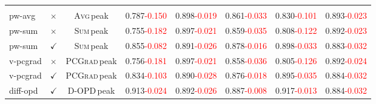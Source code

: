 \documentclass[11pt]{article}
\begin{document}
\begin{table}[ht]
{\begin{tabular}{@{}llc|cc|c|cc@{}}
\addlinespace
\multicolumn{8}{@{}l}{\textit{OPD training (running, peak eval)}} \\
pw-avg & $\times$ & \textsc{Avg}{\footnotesize\,peak} & \cellcolor{gray!20}0.787{\footnotesize\textcolor{red}{-0.150}} & 0.898{\footnotesize\textcolor{red}{-0.019}} & \cellcolor{gray!20}0.861{\footnotesize\textcolor{red}{-0.033}} & \cellcolor{gray!20}0.830{\footnotesize\textcolor{red}{-0.101}} & 0.893{\footnotesize\textcolor{red}{-0.023}} \\
pw-sum & $\times$ & \textsc{Sum}{\footnotesize\,peak} & \cellcolor{gray!20}0.755{\footnotesize\textcolor{red}{-0.182}} & 0.897{\footnotesize\textcolor{red}{-0.021}} & \cellcolor{gray!20}0.859{\footnotesize\textcolor{red}{-0.035}} & \cellcolor{gray!20}0.808{\footnotesize\textcolor{red}{-0.122}} & 0.892{\footnotesize\textcolor{red}{-0.023}} \\
pw-sum & $\checkmark$ & \textsc{Sum}{\footnotesize\,peak} & \cellcolor{gray!20}0.855{\footnotesize\textcolor{red}{-0.082}} & 0.891{\footnotesize\textcolor{red}{-0.026}} & \cellcolor{gray!20}0.878{\footnotesize\textcolor{red}{-0.016}} & \cellcolor{gray!20}0.898{\footnotesize\textcolor{red}{-0.033}} & 0.883{\footnotesize\textcolor{red}{-0.032}} \\
v-pcgrad & $\times$ & \textsc{PCGrad}{\footnotesize\,peak} & \cellcolor{gray!20}0.756{\footnotesize\textcolor{red}{-0.181}} & 0.897{\footnotesize\textcolor{red}{-0.021}} & \cellcolor{gray!20}0.858{\footnotesize\textcolor{red}{-0.036}} & \cellcolor{gray!20}0.805{\footnotesize\textcolor{red}{-0.126}} & 0.892{\footnotesize\textcolor{red}{-0.024}} \\
v-pcgrad & $\checkmark$ & \textsc{PCGrad}{\footnotesize\,peak} & \cellcolor{gray!20}0.834{\footnotesize\textcolor{red}{-0.103}} & 0.890{\footnotesize\textcolor{red}{-0.028}} & \cellcolor{gray!20}0.876{\footnotesize\textcolor{red}{-0.018}} & \cellcolor{gray!20}0.895{\footnotesize\textcolor{red}{-0.035}} & 0.884{\footnotesize\textcolor{red}{-0.032}} \\
diff-opd & $\checkmark$ & \textsc{D-OPD}{\footnotesize\,peak} & \cellcolor{gray!20}0.913{\footnotesize\textcolor{red}{-0.024}} & 0.892{\footnotesize\textcolor{red}{-0.026}} & \cellcolor{gray!20}0.887{\footnotesize\textcolor{red}{-0.008}} & \cellcolor{gray!20}0.917{\footnotesize\textcolor{red}{-0.013}} & 0.884{\footnotesize\textcolor{red}{-0.032}} \\
\bottomrule
\end{tabular}
}
\end{table}
\end{document}

